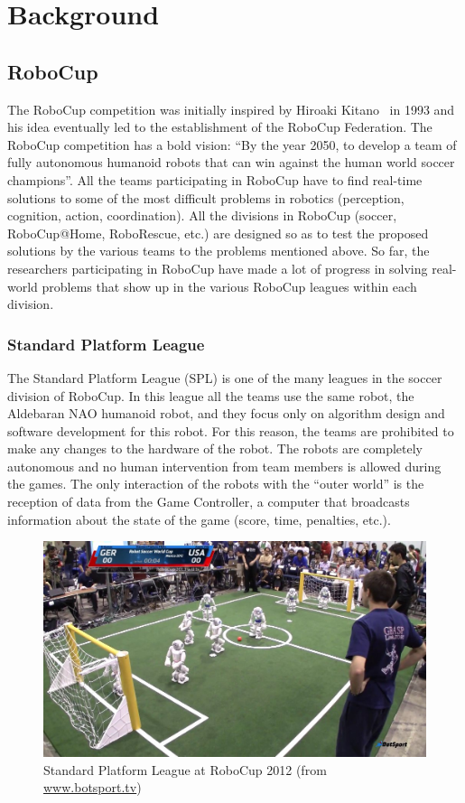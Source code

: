 \chapter{Background}
\label{Background}
\section{RoboCup}
The RoboCup competition was initially inspired by Hiroaki Kitano~\cite{robocup} in 1993 and his idea eventually led to the establishment of the RoboCup Federation. The RoboCup competition has a bold vision: ``By the year 2050, to develop a team of fully autonomous humanoid robots that can win against the human world soccer champions''. All the teams participating in RoboCup have to find real-time solutions to some of the most difficult problems in robotics (perception, cognition, action, coordination). All the divisions in RoboCup (soccer, RoboCup@Home, RoboRescue, etc.) are designed so as to test the proposed solutions by the various teams to the problems mentioned above. So far, the researchers participating in RoboCup have made a lot of progress in solving real-world problems that show up in the various RoboCup leagues within each division.

\subsection{Standard Platform League}
The Standard Platform League (SPL) is one of the many leagues in the soccer division of RoboCup. In this league all the teams use the same robot, the Aldebaran NAO humanoid robot, and they focus only on algorithm design and software development for this robot. For this reason, the teams are prohibited to make any changes to the hardware of the robot. The robots are completely autonomous and no human intervention from team members is allowed during the games. The only interaction of the robots with the ``outer world'' is the reception of data from the Game Controller, a computer that broadcasts information about the state of the game (score, time, penalties, etc.).

\begin{figure}[t!]
	\begin{center}
		\includegraphics[width=.9\textwidth]{Figures/spl2012.jpg}
 		\caption{Standard Platform League at RoboCup 2012 (from \url{www.botsport.tv})}
 		\label{fig:RoboCup SPL}
	\end{center}
\end{figure}

